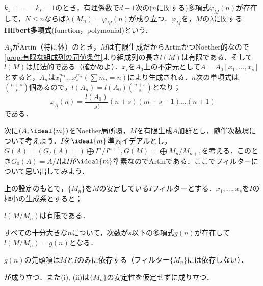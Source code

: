 \begin{defi}[Hilbert多項式]\label{defi:Hilbert多項式}
	$k_1=\dots=k_s=1$のとき，有理係数で$d-1$次の($n$に関する)多項式$\varphi_M(n)$が存在して，$N
	\leq n$ならば$\lambda(M_n)=\varphi_M(n)$が成り立つ．$\varphi_M$を，$M$の$\lambda$に関する\textbf{Hilbert多項式}(function，polymonial)という．
\end{defi}

$A_0$がArtin（特に体）のとき，$M$は有限生成だからArtinかつNoether的なので\ref{prop:有限な組成列の同値条件}より組成列の長さ$l(M)$は有限である．そして$l(M)$は加法的である（確かめよ）．$x_i$を$A_0$上の不定元として$A=A_0[x_1,\dots,x_s]$とすると，$A_n$は$x_1^{m_1}\dots x_s^{m_s} (\sum m_i=n)$により生成される．$n$次の単項式は$\binom{n+s}{s}$個あるので，$l(A_n)=l(A_0)\binom{n+s}{s}$となり；
\[\varphi_A(n)=\frac{l(A_0)}{s!}(n+s)(m+s-1)\dots(n+1)\]
である．

次に$(A,\ideal{m})$をNoether局所環，$M$を有限生成$A$加群とし，随伴次数環について考えよう．$I$を$\ideal{m}$準素イデアルとし，$G(A)=(G_I(A)=)\bigoplus I^n/I^{n+1},G(M)=\bigoplus M_n/M_{n+1}$を考える．このとき$G_0(A)=A/I$は$I$が$\ideal{m}$準素なのでArtinである．ここでフィルターについて思い出してみよう．

\begin{prop}\label{prop:フィルターとHilbert多項式}
	上の設定のもとで，$\{M_n\}$を$M$の安定している$I$フィルターとする．$x_1,\dots,x_s$を$I$の極小の生成系とすると；
	\begin{sakura}
		\item $l(M/M_n)$は有限である．
		\item すべての十分大きな$n$について，次数が$s$以下の多項式$g(n)$が存在して$l(M/M_n)=g(n)$となる．
		\item $g(n)$の先頭項は$M$と$I$のみに依存する（フィルター$\{M_n\}$には依存しない）．
	\end{sakura}
	が成り立つ．また(i), (ii)は$\{M_n\}$の安定性を仮定せずに成り立つ．
\end{prop}

